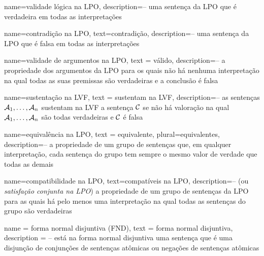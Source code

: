 


{
name=validade lógica na LPO,
description={-- uma sentença da LPO que é verdadeira em todas as interpretações}
}

{
  name=contradição na LPO,
  text=contradição,
description={--  uma sentença da LPO que é falsa em todas as interpretações}
} 

{
  name=validade de argumentos na LPO,
  text = válido,
description={-- a propriedade dos argumentos da LPO para os quais não há nenhuma interpretação na qual todas as suas premissas são verdadeiras e a conclusão é falsa}
}

{
  name=sustentação na LVF,
  text = sustentam na LVF,
description={-- as sentenças $\mathcal{A}_1, \ldots, \mathcal{A}_n$ sustentam na LVF a sentença $\mathcal{C}$ se não há valoração na qual $\mathcal{A}_1, \ldots, \mathcal{A}_n$ são todas verdadeiras e $\mathcal{C}$ é falsa}
}

{
  name=equivalência na LPO,
  text = equivalente,
  plural=equivalentes,
description={-- a propriedade de um grupo de sentenças que, em qualquer interpretação, cada sentença do grupo tem sempre o mesmo valor de verdade que todas as demais}
}

{
  name=compatibilidade na LPO,
  text=compatíveis na LPO,
description={-- (ou \textit{satisfação conjunta na LPO}) a propriedade de um grupo de sentenças da LPO para as quais há pelo menos uma interpretação na qual todas as sentenças do grupo são verdadeiras}
}

{
  name = forma normal disjuntiva (FND),
  text = forma normal disjuntiva,
  description = {-- está na forma normal disjuntiva uma sentença que é uma disjunção de conjunções de sentenças atômicas ou negações de sentenças atômicas}
}


